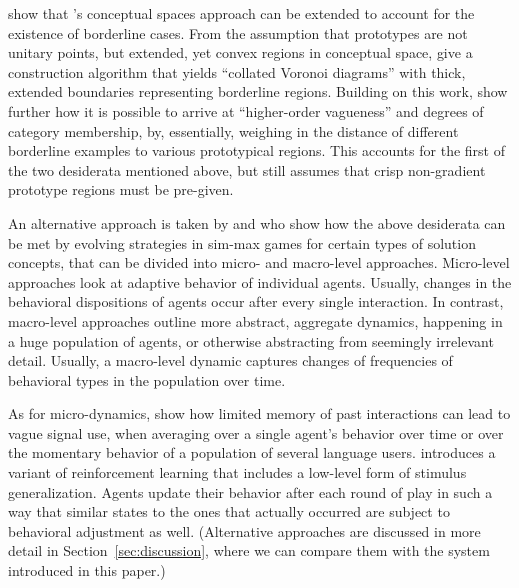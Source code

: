 \citet{DouvenDecock2011:Vagueness:-A-Co} show that
\citeauthor{Gardenfors2000:Conceptual-Spac}'s conceptual spaces
approach can be extended to account for the existence of borderline
cases. From the assumption that prototypes are not unitary points, but
extended, yet convex regions in conceptual space,
\citeauthor{DouvenDecock2011:Vagueness:-A-Co} give a construction
algorithm that yields ``collated Voronoi diagrams'' with thick,
extended boundaries representing borderline regions. Building on this
work, \citet{DecockDouven2012:What-is-Graded-} show further how it is
possible to arrive at ``higher-order vagueness'' and degrees of
category membership, by, essentially, weighing in the distance of
different borderline examples to various prototypical regions. This
accounts for the first of the two desiderata mentioned above, but
still assumes that crisp non-gradient prototype regions must be
pre-given.

An alternative approach is taken by
\citet{FrankeJager2010:Vagueness-Signa} and
\citet{OConnor2013:The-Evolution-o} who show how the above desiderata
can be met by evolving strategies in sim-max games for certain types
of solution concepts, that can be divided into micro- and macro-level
approaches. Micro-level approaches look at adaptive behavior of
individual agents. Usually, changes in the behavioral dispositions of
agents occur after every single interaction. In contrast, macro-level
approaches outline more abstract, aggregate dynamics, happening in a
huge population of agents, or otherwise abstracting from seemingly
irrelevant detail. Usually, a macro-level dynamic captures changes of
frequencies of behavioral types in the population over time.

As for micro-dynamics, \citet{FrankeJager2010:Vagueness-Signa} show
how limited memory of past interactions can lead to vague signal use,
when averaging over a single agent's behavior over time or over the
momentary behavior of a population of several language
users. \citet{OConnor2013:The-Evolution-o} introduces a variant of
reinforcement learning that includes a low-level form of stimulus
generalization. Agents update their behavior after each round of play
in such a way that similar states to the ones that actually occurred
are subject to behavioral adjustment as well. (Alternative approaches
are discussed in more detail in Section~\ref{sec:discussion}, where we
can compare them with the system introduced in this paper.)

